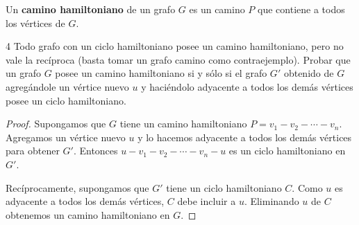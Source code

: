 \vspace{0.5cm}

\begin{definition}
    Un \textbf{camino hamiltoniano} de un grafo \( G \) es un camino \( P \) que contiene a todos los vértices de \( G \).
\end{definition}

\begin{ejercicioEntregar}{4}
    Todo grafo con un ciclo hamiltoniano posee un camino hamiltoniano, pero no vale la recíproca (basta tomar un grafo camino como contraejemplo). Probar que un grafo \( G \) posee un camino hamiltoniano si y sólo si el grafo \( G' \) obtenido de \( G \) agregándole un vértice nuevo \( u \) y haciéndolo adyacente a todos los demás vértices posee un ciclo hamiltoniano.
\end{ejercicioEntregar}
\begin{proof}
    Supongamos que \( G \) tiene un camino hamiltoniano \( P = v_1 - v_2 - \cdots - v_n \). Agregamos un vértice nuevo \( u \) y lo hacemos adyacente a todos los demás vértices para obtener \( G' \). Entonces \( u - v_1 - v_2 - \cdots - v_n - u \) es un ciclo hamiltoniano en \( G' \).

    Recíprocamente, supongamos que \( G' \) tiene un ciclo hamiltoniano \( C \). Como \( u \) es adyacente a todos los demás vértices, \( C \) debe incluir a \( u \). Eliminando \( u \) de \( C \) obtenemos un camino hamiltoniano en \( G \).
\end{proof}

\vspace{0.5cm}

